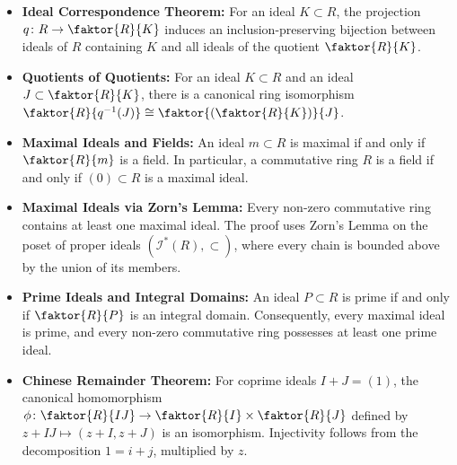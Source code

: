 \begin{overview}
\begin{itemize}
    \item \textbf{Ideal Correspondence Theorem:} For an ideal $K \subset R$, the projection $q \colon R \to \faktor{R}{K}$ induces an inclusion-preserving bijection between ideals of $R$ containing $K$ and all ideals of the quotient $\faktor{R}{K}$.
    \item \textbf{Quotients of Quotients:} For an ideal $K \subset R$ and an ideal $J \subset \faktor{R}{K}$, there is a canonical ring isomorphism $\faktor{R}{q^{-1}(J)} \cong \faktor{\left(\faktor{R}{K}\right)}{J}$.
    \item \textbf{Maximal Ideals and Fields:} An ideal $m \subset R$ is maximal if and only if $\faktor{R}{m}$ is a field. In particular, a commutative ring $R$ is a field if and only if $(0) \subset R$ is a maximal ideal.
    \item \textbf{Maximal Ideals via Zorn's Lemma:} Every non-zero commutative ring contains at least one maximal ideal. The proof uses Zorn's Lemma on the poset of proper ideals $(\mathscr{I}^*(R), \subset)$, where every chain is bounded above by the union of its members.
    \item \textbf{Prime Ideals and Integral Domains:} An ideal $P \subset R$ is prime if and only if $\faktor{R}{P}$ is an integral domain. Consequently, every maximal ideal is prime, and every non-zero commutative ring possesses at least one prime ideal.
    \item \textbf{Chinese Remainder Theorem:} For coprime ideals $I + J = (1)$, the canonical homomorphism $\phi \colon \faktor{R}{IJ} \to \faktor{R}{I} \times \faktor{R}{J}$ defined by $z + IJ \mapsto (z + I, z + J)$ is an isomorphism. Injectivity follows from the decomposition $1 = i + j$, multiplied by $z$.
\end{itemize}
\end{overview}